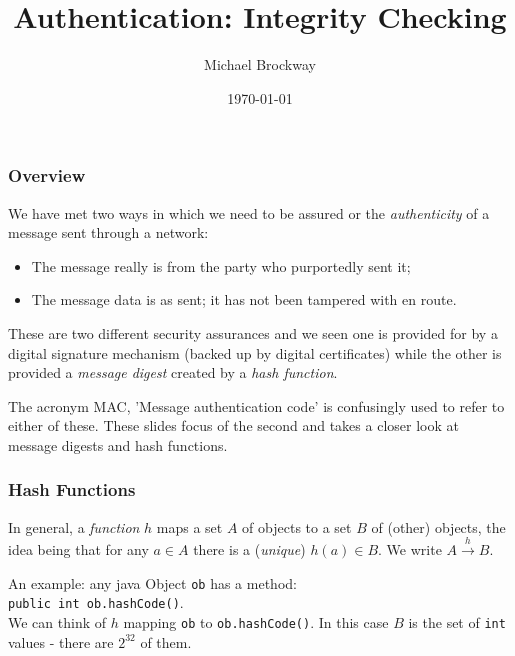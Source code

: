 \documentclass[10pt, hyperref={pdfpagelabels=false}]{beamer}
\title{Authentication: Integrity Checking}
\author{Michael Brockway}
\date{\today}
\begin{document}
\begin{frame}
\titlepage
\end{frame}

\begin{frame}
\frametitle{Overview}
We have met two ways in which we need to be assured or the \emph{authenticity} of a message sent through a network:
\begin{itemize}
\item The message really is from the party who purportedly sent it; 
\item The message data is as sent; it has not been tampered with en route. 
\end{itemize}

These are two different security assurances and we seen one is provided for by a digital signature mechanism (backed up by digital certificates) while the other is provided a \emph{message digest} created by a \emph{hash function}.

The acronym MAC, 'Message authentication code' is confusingly used to refer to either of these. These slides focus of the second and takes a closer look at message digests and hash functions.
\end{frame}

\begin{frame}
\frametitle{Hash Functions}
\begin{center}
\end{center}
In general, a \emph{function} $h$ maps a set $A$ of objects to a set $B$ of (other) objects, the idea being that for any $a \in A$ there is a (\emph{unique}) $h(a) \in B$. We write $A \stackrel{h}{\rightarrow} B$.

An example: any java Object \texttt{ob} has a method:\\
\texttt{\color{blue}public int ob.hashCode()}.\\
We can think of $h$ mapping \texttt{ob} to \texttt{ob.hashCode()}. In this case $B$ is the set of \texttt{int} values - there are $2^{32}$ of them.
\end{frame}
\end{document}
